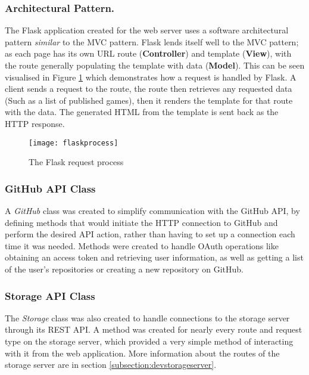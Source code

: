 	\subsubsection{Architectural Pattern.}
	The Flask application created for the web server uses a software architectural pattern \emph{similar} to the MVC pattern. Flask lends itself well to the MVC pattern; as each page has its own URL route (\textbf{Controller}) and template (\textbf{View}), with the route generally populating the template with data (\textbf{Model}). This can be seen visualised in Figure \ref{fig:flaskprocess} which demonstrates how a request is handled by Flask. A client sends a request to the route, the route then retrieves any requested data (Such as a list of published games), then it renders the template for that route with the data. The generated HTML from the template is sent back as the HTTP response.

	\begin{figure}[h]
		\centering
		\texttt{[image: flaskprocess]}
		\caption{The Flask request process}
		\label{fig:flaskprocess}
	\end{figure}

	\subsubsection{GitHub API Class}
	A \emph{GitHub} class was created to simplify communication with the GitHub API, by defining methods that would initiate the HTTP connection to GitHub and perform the desired API action, rather than having to set up a connection each time it was needed. Methods were created to handle OAuth operations like obtaining an access token and retrieving user information, as well as getting a list of the user's repositories or creating a new repository on GitHub.

	\subsubsection{Storage API Class}
	The \emph{Storage} class was also created to handle connections to the storage server through its REST API. A method was created for nearly every route and request type on the storage server, which provided a very simple method of interacting with it from the web application. More information about the routes of the storage server are in section \ref{subsection:devstorageserver}.

